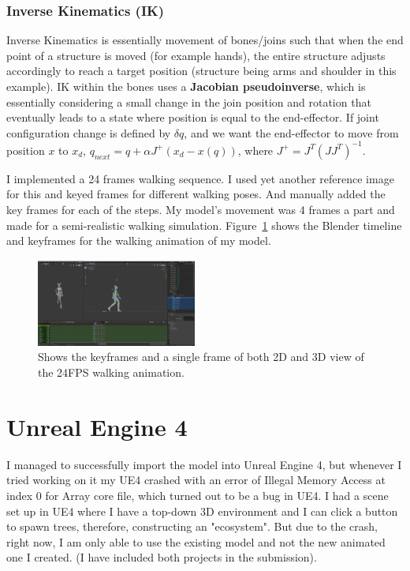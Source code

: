 \documentclass[acmtog]{acmart}
\begin{document}
\subsubsection{Inverse Kinematics (IK)}
Inverse Kinematics is essentially movement of bones/joins such that when the end point of a structure is moved (for example hands), the entire structure adjusts accordingly to reach a target position (structure being arms and shoulder in this example). IK within the bones uses a \textbf{Jacobian pseudoinverse}, which is essentially considering a small change in the join position and rotation that eventually leads to a state where position is equal to the end-effector. If joint configuration change is defined by $\delta q$, and we want the end-effector to move from position $x$ to $x_d$, $q_{next} = q + \alpha J^{+} (x_d - x(q))$, where $J^{+} = J^T (JJ^T)^{-1}$.

I implemented a 24 frames walking sequence. I used yet another reference image for this and keyed frames for different walking poses. And manually added the key frames for each of the steps. My model's movement was 4 frames a part and made for a semi-realistic walking simulation. Figure~\ref{fig:walking} shows the Blender timeline and keyframes for the walking animation of my model.

\begin{figure}[ht]
  \centering
  \includegraphics[width=0.47\textwidth]{images/walking.png}
  \caption{Shows the keyframes and a single frame of both 2D and 3D view of the 24FPS walking animation.}  \label{fig:walking}
\end{figure}

\section{Unreal Engine 4}
I managed to successfully import the model into Unreal Engine 4, but whenever I tried working on it my UE4 crashed with an error of Illegal Memory Access at index 0 for Array core file, which turned out to be a bug in UE4. I had a scene set up in UE4 where I have a top-down 3D environment and I can click a button to spawn trees, therefore, constructing an "ecosystem". But due to the crash, right now, I am only able to use the existing model and not the new animated one I created. (I have included both projects in the submission).




\end{document}
